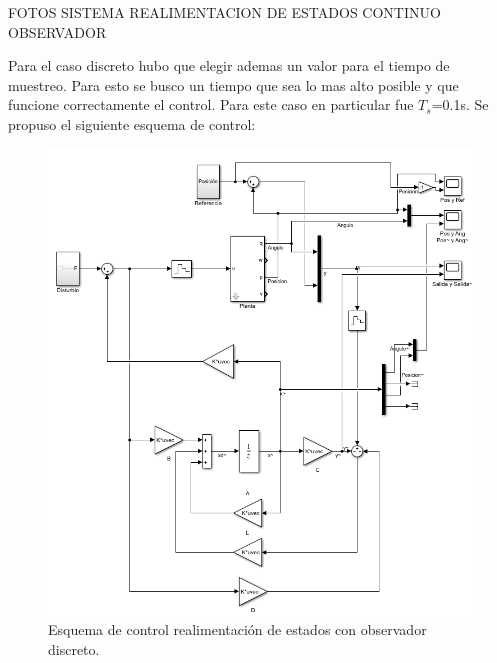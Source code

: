 FOTOS SISTEMA REALIMENTACION DE ESTADOS CONTINUO OBSERVADOR

Para el caso discreto hubo que elegir ademas un valor para el tiempo de muestreo. Para esto se busco un tiempo que sea lo mas alto posible y que funcione correctamente el control. Para este caso en particular fue $T_s$=0.1s.
Se propuso el siguiente esquema de control:
\begin{figure}[H]
	\centering
	\includegraphics[width=1\linewidth]{Imagenes/Esquema_general_obs_disc.png}
	\caption{Esquema de control realimentación de estados con observador discreto.}
	\label{esqdisctobs}
\end{figure}

